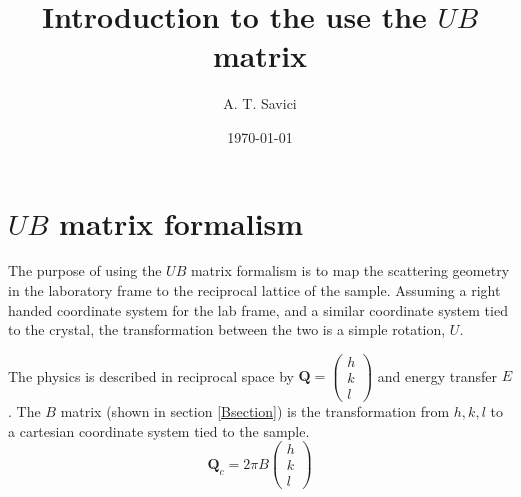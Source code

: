 \documentclass[prb]{revtex4}%
\begin{document}

\title{Introduction to the use the $UB$ matrix} %

\author{A. T. Savici}


\date{\today}%



\maketitle

\section{$UB$ matrix formalism}

The purpose of using the $UB$ matrix formalism is to map the
scattering geometry in the laboratory frame to the
reciprocal lattice of the sample. Assuming a right handed coordinate
system for the lab frame, and a similar coordinate system tied to the crystal,
the transformation between the two is a simple rotation, $U$.

The physics is described in reciprocal space by $\textbf{Q} = \left(\begin{array}{c}
                                                            h \\
                                                            k \\
                                                            l
                                                          \end{array}\right)$
and energy transfer $E$. The $B$ matrix (shown in section \ref{Bsection}) is the transformation
from $h, k, l$ to a cartesian coordinate system tied to the sample.
\begin{equation}
    \textbf{Q}_c=2 \pi B \left(\begin{array}{c}
                                                            h \\
                                                            k \\
                                                            l
                                                          \end{array}\right)
\end{equation}
\end{document}

